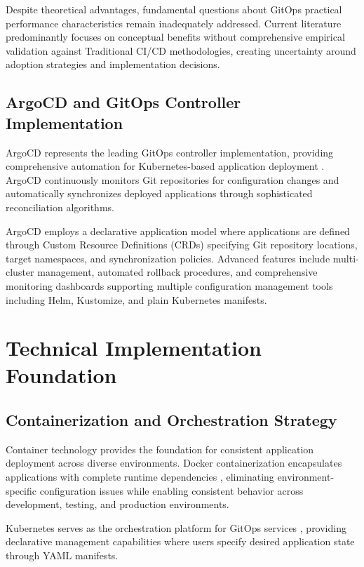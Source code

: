 Despite theoretical advantages, fundamental questions about GitOps practical performance characteristics remain inadequately addressed. Current literature predominantly focuses on conceptual benefits without comprehensive empirical validation against Traditional CI/CD methodologies, creating uncertainty around adoption strategies and implementation decisions.

\subsection{ArgoCD and GitOps Controller Implementation}

ArgoCD represents the leading GitOps controller implementation, providing comprehensive automation for Kubernetes-based application deployment \cite{argocd2023documentation}. ArgoCD continuously monitors Git repositories for configuration changes and automatically synchronizes deployed applications through sophisticated reconciliation algorithms.

ArgoCD employs a declarative application model where applications are defined through Custom Resource Definitions (CRDs) specifying Git repository locations, target namespaces, and synchronization policies. Advanced features include multi-cluster management, automated rollback procedures, and comprehensive monitoring dashboards supporting multiple configuration management tools including Helm, Kustomize, and plain Kubernetes manifests.

\section{Technical Implementation Foundation}

\subsection{Containerization and Orchestration Strategy}

Container technology provides the foundation for consistent application deployment across diverse environments. Docker containerization encapsulates applications with complete runtime dependencies \cite{docker2023documentation}, eliminating environment-specific configuration issues while enabling consistent behavior across development, testing, and production environments.

Kubernetes serves as the orchestration platform for GitOps services \cite{kubernetes2023documentation}, providing declarative management capabilities where users specify desired application state through YAML manifests.

